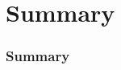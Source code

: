 \documentclass{beamer}
\begin{document}
\section{Summary}
\begin{frame}
\frametitle{\Huge Summary}
\end{frame}
\end{document}
